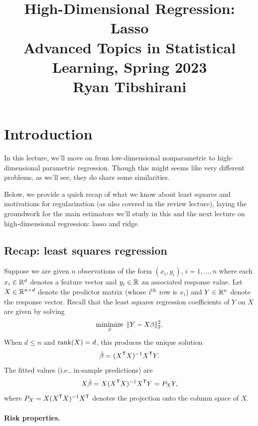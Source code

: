 \documentclass{article}
\title{High-Dimensional Regression: Lasso \\ \smallskip
\large Advanced Topics in Statistical Learning, Spring 2023 \\ \smallskip
Ryan Tibshirani}
\date{}
\begin{document}
\maketitle
\RaggedRight
\vspace{-50pt}

\section{Introduction}

In this lecture, we'll move on from low-dimensional nonparametric to
high-dimensional parametric regression. Though this might seems like very  
different problems, as we'll see, they do share some similarities.

Below, we provide a quick recap of what we know about least squares and
motivations for regularization (as also covered in the review lecture), laying
the groundwork for the main estimators we'll study in this and the next lecture
on high-dimensional regression: lasso and ridge.  

\subsection{Recap: least squares regression}

Suppose we are given $n$ observations of the form $(x_i, y_i)$, $i=1,\dots,n$
where each $x_i \in \mathbb{R}^d$ denotes a feature vector and $y_i \in \mathbb{R}$ an
associated response value. Let $X \in \mathbb{R}^{n \times d}$ denote the predictor
matrix (whose $i^{\text{th}}$ row is $x_i$) and $Y \in \mathbb{R}^n$ denote the response 
vector. Recall that the least squares regression coefficients of $Y$ on $X$ are
given by solving  
\begin{equation}
\label{eq:ls}
\mathop{\mathrm{minimize}}_\beta \; \|Y - X\beta\|_2^2.
\end{equation}
When $d \leq n$ and $\mathrm{rank}(X) = d$, this produces the unique solution 
\[
\hat{\beta} = (X^{\mathsf{T}} X)^{-1} X^{\mathsf{T}} Y.  
\]
The fitted values (i.e., in-sample predictions) are 
\[
X\hat{\beta} = X (X^{\mathsf{T}} X)^{-1} X^{\mathsf{T}} Y = P_X Y,
\]
where $P_X = X (X^{\mathsf{T}} X)^{-1} X^{\mathsf{T}} $ denotes the projection onto the column space
of $X$. 

\paragraph{Risk properties.}
\end{document}
